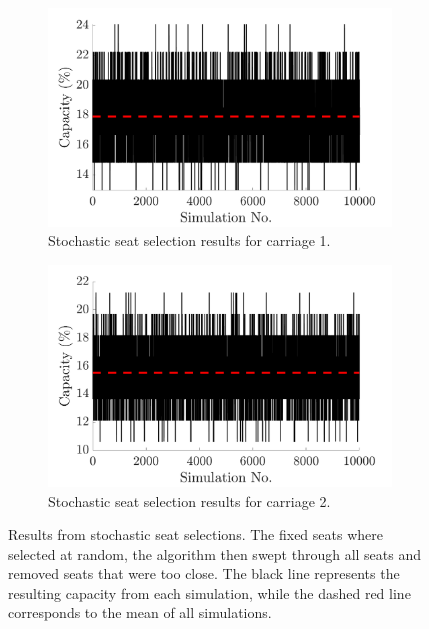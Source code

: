 \documentclass[11pt,a4paper]{article}
\begin{document}
\begin{itemize}
\begin{figure}[H]
         \centering
 \begin{subfigure}[b]{0.48\textwidth}
         \centering
         \includegraphics[width=1\textwidth]{tfw_car1_sim_plot_write.png}
         \caption{Stochastic seat selection results for carriage 1.}
         \label{fig:sim1}
     \end{subfigure}
          \hfill
     \begin{subfigure}[b]{0.48\textwidth}
         \centering
         \includegraphics[width=1\textwidth]{tfw_car2_sim_plot_write.png}
         \caption{Stochastic seat selection results for carriage 2.}
         \label{fig:sim2}
     \end{subfigure}
     
 
 \caption{Results from stochastic seat selections. The fixed seats where selected at random, the algorithm then swept through all seats and removed seats that were too close. The black line represents the resulting capacity from each simulation, while the dashed red line corresponds to the mean of all simulations.}
        \label{fig:Stochastic_sims}
\end{figure}









\end{itemize}
\end{document}
